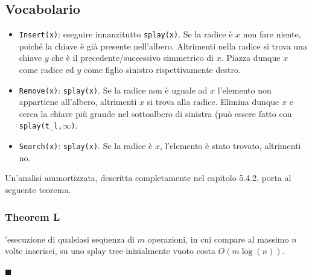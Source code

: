 \documentclass[a4paper]{book}
\newenvironment{mytheorem}[1]{\subsubsection*{Theorem #1}}{\begin{flushright}$\blacksquare$\end{flushright}}
\newcommand{\inline}[1]{\lstinline!#1!}%
\begin{document}
\subsection*{Vocabolario}
\begin{itemize}
\item \inline{Insert(x)}: eseguire innanzitutto \inline{splay(x)}. Se la radice è $x$ non fare niente, poiché la chiave è già presente nell'albero. Altrimenti nella radice si trova una chiave $y$ che è il precedente/successivo simmetrico di $x$. Piazza dunque $x$ come radice ed $y$ come figlio sinistro rispettivamente destro.
\item \inline{Remove(x)}: \inline{splay(x)}. Se la radice non è uguale ad $x$ l'elemento non appartiene all'albero, altrimenti $x$ si trova alla radice. Elimina dunque $x$ e cerca la chiave più grande nel sottoalbero di sinistra (può essere fatto con \inline{splay(t_l,}$\infty$\inline{)}. 
\item \inline{Search(x)}: \inline{splay(x)}. Se la radice è $x$, l'elemento è stato trovato, altrimenti no.
\end{itemize}
Un'analisi ammortizzata, descritta completamente nel capitolo 5.4.2, porta al seguente teorema.
\begin{mytheorem}{5.1}
L'esecuzione di qualsiasi sequenza di $m$ operazioni, in cui compare al massimo $n$ volte inserisci, su uno splay tree inizialmente vuoto costa $O(m\log (n))$. 
\end{mytheorem}
\end{document}
